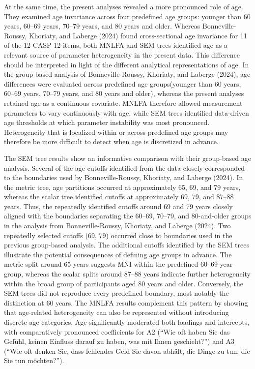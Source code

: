 \documentclass[
  man,
  floatsintext]{apa7}
\begin{document}
At the same time, the present analyses revealed a more pronounced role
of age. They examined age invariance across four predefined age groups:
younger than 60 years, 60--69 years, 70--79 years, and 80 years and
older. Whereas Bonneville-Roussy, Khoriaty, and Laberge (2024) found
cross-sectional age invariance for 11 of the 12 CASP-12 items, both
MNLFA and SEM trees identified age as a relevant source of parameter
heterogeneity in the present data. This difference should be interpreted
in light of the different analytical representations of age. In the
group-based analysis of Bonneville-Roussy, Khoriaty, and Laberge (2024),
age differences were evaluated across predefined age groups(younger than
60 years, 60--69 years, 70--79 years, and 80 years and older), whereas
the present analyses retained age as a continuous covariate. MNLFA
therefore allowed measurement parameters to vary continuously with age,
while SEM trees identified data-driven age thresholds at which parameter
instability was most pronounced. Heterogeneity that is localized within
or across predefined age groups may therefore be more difficult to
detect when age is discretized in advance.

The SEM tree results show an informative comparison with their
group-based age analysis. Several of the age cutoffs identified from the
data closely corresponded to the boundaries used by Bonneville-Roussy,
Khoriaty, and Laberge (2024). In the metric tree, age partitions
occurred at approximately 65, 69, and 79 years, whereas the scalar tree
identified cutoffs at approximately 69, 79, and 87--88 years. Thus, the
repeatedly identified cutoffs around 69 and 79 years closely aligned
with the boundaries separating the 60--69, 70--79, and 80-and-older
groups in the analysis from Bonneville-Roussy, Khoriaty, and Laberge
(2024). Two repeatedly selected cutoffs (69, 79) occurred close to
boundaries used in the previous group-based analysis. The additional
cutoffs identified by the SEM trees illustrate the potential
consequences of defining age groups in advance. The metric split around
65 years suggests MNI within the predefined 60--69-year group, whereas
the scalar splits around 87--88 years indicate further heterogeneity
within the broad group of participants aged 80 years and older.
Conversely, the SEM trees did not reproduce every predefined boundary,
most notably the distinction at 60 years. The MNLFA results complement
this pattern by showing that age-related heterogeneity can also be
represented without introducing discrete age categories. Age
significantly moderated both loadings and intercepts, with comparatively
pronounced coefficients for A2 (``Wie oft haben Sie das Gefühl, keinen
Einfluss darauf zu haben, was mit Ihnen geschieht?'') and A3 (``Wie oft
denken Sie, dass fehlendes Geld Sie davon abhält, die Dinge zu tun, die
Sie tun möchten?'').
\end{document}
